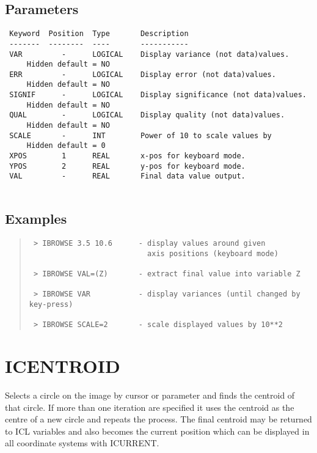 \documentclass{book}
\renewcommand{\_}{{\tt\char'137}}     %
\begin{document}
\subsection{Parameters}
\begin{verbatim}
 Keyword  Position  Type       Description
 -------  --------  ----       -----------
 VAR         -      LOGICAL    Display variance (not data)values.
     Hidden default = NO
 ERR         -      LOGICAL    Display error (not data)values.
     Hidden default = NO
 SIGNIF      -      LOGICAL    Display significance (not data)values.
     Hidden default = NO
 QUAL        -      LOGICAL    Display quality (not data)values.
     Hidden default = NO
 SCALE       -      INT        Power of 10 to scale values by
     Hidden default = 0
 XPOS        1      REAL       x-pos for keyboard mode.
 YPOS        2      REAL       y-pos for keyboard mode.
 VAL         -      REAL       Final data value output.
 
\end{verbatim}\subsection{Examples}
\begin{quote}\begin{verbatim}
 > IBROWSE 3.5 10.6      - display values around given
                           axis positions (keyboard mode)
 
 > IBROWSE VAL=(Z)       - extract final value into variable Z
 
 > IBROWSE VAR           - display variances (until changed by key-press)
 
 > IBROWSE SCALE=2       - scale displayed values by 10**2
\end{verbatim}\end{quote}
\section{ICENTROID}
Selects a circle on the image by cursor or parameter and finds
the centroid of that circle. If more than one iteration are
specified it uses the centroid as the centre of a new circle
and repeats the process. The final centroid may be returned
to ICL variables and also becomes the current position which
can be displayed in all coordinate systems with ICURRENT.
 
\end{document}
